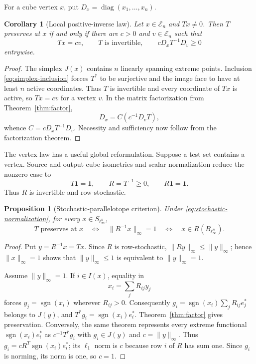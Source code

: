 \documentclass[11pt]{article}
\newtheorem{corollary}[theorem]{Corollary}
\newtheorem{proposition}[theorem]{Proposition}
\theoremstyle{definition}
\theoremstyle{remark}
\newcommand{\E}{\mathcal E_n}
\newcommand{\diag}{\operatorname{diag}}
\newcommand{\sgn}{\operatorname{sgn}}
\newcommand{\one}{\mathbf 1}
\begin{document}
For a cube vertex $x$, put $D_x=\diag(x_1,\ldots,x_n)$.

\begin{corollary}[Local positive-inverse law]\label{cor:vertex-law}
Let $x\in\E$ and $Tx\neq0$.  Then $T$ preserves at $x$ if and only if there
are $c>0$ and $v\in\E$ such that
\[
 Tx=cv,\qquad T\text{ is invertible},\qquad
 cD_xT^{-1}D_v\geq0
\]
entrywise.
\end{corollary}

\begin{proof}
The simplex $J(x)$ contains $n$ linearly spanning extreme points.  Inclusion
\eqref{eq:simplex-inclusion} forces $T^*$ to be surjective and the image face
to have at least $n$ active coordinates.  Thus $T$ is invertible and every
coordinate of $Tx$ is active, so $Tx=cv$ for a vertex $v$.  In the matrix
factorization from Theorem~\ref{thm:factor},
\[
 D_x=C(c^{-1}D_vT),
\]
whence $C=cD_xT^{-1}D_v$.  Necessity and sufficiency now follow from the
factorization theorem.
\end{proof}

The vertex law has a useful global reformulation.  Suppose a test set
contains a vertex.  Source and output cube isometries and scalar
normalization reduce the nonzero case to
\begin{equation}\label{eq:stochastic-normalization}
 T\one=\one,\qquad R=T^{-1}\geq0,\qquad R\one=\one.
\end{equation}
Thus $R$ is invertible and row-stochastic.

\begin{proposition}[Stochastic-parallelotope criterion]\label{prop:stochastic}
Under \eqref{eq:stochastic-normalization}, for every
$x\in S_{\ell_\infty^n}$,
\[
 T\text{ preserves at }x
 \quad\Longleftrightarrow\quad
 \|R^{-1}x\|_\infty=1
 \quad\Longleftrightarrow\quad
 x\in R(B_{\ell_\infty^n}).
\]
\end{proposition}

\begin{proof}
Put $y=R^{-1}x=Tx$.  Since $R$ is row-stochastic,
$\|Ry\|_\infty\leq\|y\|_\infty$; hence $\|x\|_\infty=1$ shows that
$\|y\|_\infty\leq1$ is equivalent to $\|y\|_\infty=1$.

Assume $\|y\|_\infty=1$.  If $i\in I(x)$, equality in
\[
 x_i=\sum_jR_{ij}y_j
\]
forces $y_j=\sgn(x_i)$ wherever $R_{ij}>0$.  Consequently
$g_i=\sgn(x_i)\sum_jR_{ij}e_j^*$ belongs to $J(y)$, and
$T^*g_i=\sgn(x_i)e_i^*$.  Theorem~\ref{thm:factor} gives preservation.
Conversely, the same theorem represents every extreme functional
$\sgn(x_i)e_i^*$ as $c^{-1}T^*g_i$ with $g_i\in J(y)$ and
$c=\|y\|_\infty$.  Thus $g_i=cR^T\sgn(x_i)e_i^*$; its $\ell_1$ norm is
$c$ because row $i$ of $R$ has sum one.  Since $g_i$ is norming, its norm is
one, so $c=1$.
\end{proof}
\end{document}
